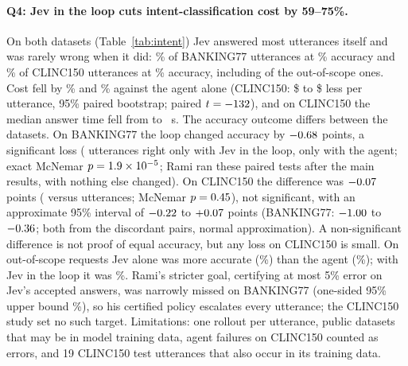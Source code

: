 \documentclass{article}
\begin{document}
\paragraph{Q4: Jev in the loop cuts intent-classification cost by 59--75\%.}
On both datasets (Table~\ref{tab:intent}) Jev answered most utterances itself and was rarely wrong when it did: \BkCoverage\% of BANKING77 utterances at \BkUsedAcc\% accuracy and \ClCoverage\% of CLINC150 utterances at \ClUsedAcc\% accuracy, including \ClUsedOos{} of the out-of-scope ones. Cost fell by \BkCostCut\% and \ClCostCut\% against the agent alone (CLINC150: \$\ClCostLow{} to \$\ClCostHigh{} less per utterance, 95\% paired bootstrap; paired $t = -132$), and on CLINC150 the median answer time fell from \ClLatAgent{} to \ClLatLoop{}~s. The accuracy outcome differs between the datasets. On BANKING77 the loop changed accuracy by $-0.68$ points, a significant loss (\BkOnlyJev{} utterances right only with Jev in the loop, \BkOnlyAgent{} only with the agent; exact McNemar $p = 1.9\times 10^{-5}$; Rami ran these paired tests after the main results, with nothing else changed). On CLINC150 the difference was $-0.07$ points (\ClOnlyJev{} versus \ClOnlyAgent{} utterances; McNemar $p = 0.45$), not significant, with an approximate 95\% interval of $-0.22$ to $+0.07$ points (BANKING77: $-1.00$ to $-0.36$; both from the discordant pairs, normal approximation). A non-significant difference is not proof of equal accuracy, but any loss on CLINC150 is small. On out-of-scope requests Jev alone was more accurate (\ClJevOos\%) than the agent (\ClAgentOos\%); with Jev in the loop it was \ClJevLoopOos\%. Rami's stricter goal, certifying at most 5\% error on Jev's accepted answers, was narrowly missed on BANKING77 (one-sided 95\% upper bound \BkCertUpper\%), so his certified policy escalates every utterance; the CLINC150 study set no such target. Limitations: one rollout per utterance, public datasets that may be in model training data, \ClAgentFail{} agent failures on CLINC150 counted as errors, and 19 CLINC150 test utterances that also occur in its training data.
\end{document}
